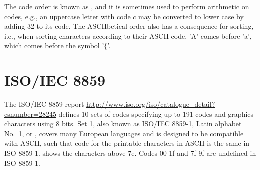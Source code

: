 The code order is known as , and it is sometimes used to perform arithmetic on codes, e.g., an uppercase letter with code $c$ may be converted to lower case by adding 32 to its code. The ASCIIbetical order also has a consequence for sorting, i.e., when sorting characters according to their ASCII code, 'A' comes before 'a', which comes before the symbol '$\{$'.

\section{ISO/IEC 8859}
The ISO/IEC 8859 report \url{http://www.iso.org/iso/catalogue_detail?csnumber=28245} defines 10 sets of codes specifying up to 191 codes and graphics characters using 8 bits. Set 1, also known as ISO/IEC 8859-1, Latin alphabet No.\ 1, or , covers many European languages and is designed to be compatible with ASCII, such that code for the printable characters in ASCII is the same in ISO 8859-1.  shows the characters above 7e. Codes 00-1f and 7f-9f are undefined in ISO 8859-1. 
